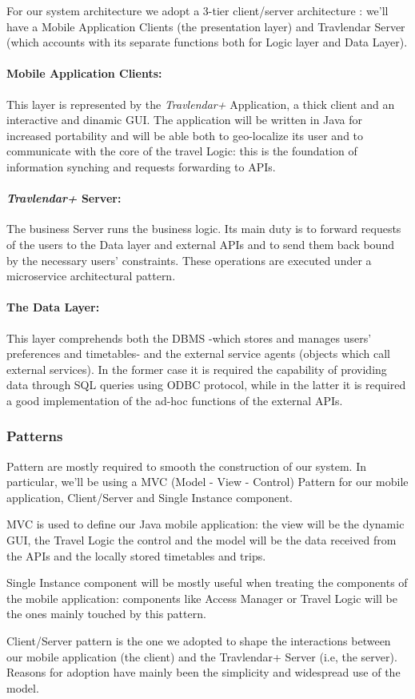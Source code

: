 For our system architecture we adopt a 3-tier client/server architecture : we'll have a Mobile Application Clients (the presentation layer) and Travlendar Server (which accounts with its separate functions both for Logic layer and Data Layer).


\paragraph{Mobile Application Clients:} This layer is represented by the \textit{Travlendar+} Application, a thick client and an interactive and dinamic GUI.
The application will be written in Java for increased portability and will be able both to geo-localize its user and to communicate with the core of the travel Logic: this is the foundation of information synching and requests forwarding to APIs.

\paragraph{\textit{Travlendar+} Server:} The business Server runs the business logic. Its main duty is to forward requests of the users to the Data layer and external APIs and to send them back bound by the necessary users' constraints. These operations are executed under a microservice architectural pattern.

\paragraph{The Data Layer:} This layer comprehends both the DBMS -which stores and manages users' preferences and timetables- and the external service agents (objects which call external services). In the former case it is required the capability of providing data through SQL queries using ODBC protocol, while in the latter it is required a good implementation of the ad-hoc functions of the external APIs.


\subsubsection*{Patterns} 

Pattern are mostly required to smooth the construction of our system. In particular, we'll be using a MVC (Model - View - Control) Pattern for our mobile application, Client/Server and Single Instance component.

MVC is used to define our Java mobile application: the view will be the dynamic GUI, the Travel Logic the control and the model will be the data received from the APIs and the locally stored timetables and trips.

Single Instance component will be mostly useful when treating the components of the mobile application: components like Access Manager or Travel Logic will be the ones mainly touched by this pattern.

Client/Server pattern is the one we adopted to shape the interactions between our mobile application (the client) and the Travlendar+ Server (i.e, the server). Reasons for adoption have mainly been the simplicity and widespread use of the model.
